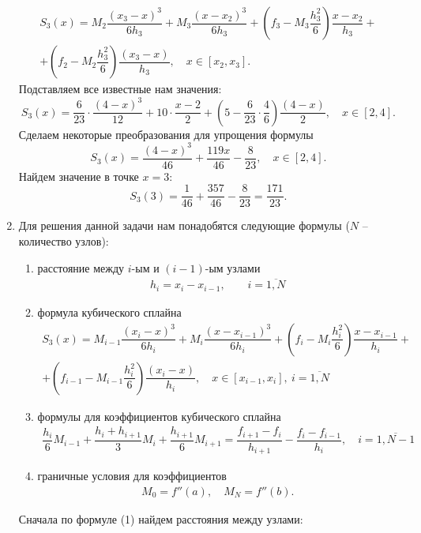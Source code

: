 \documentclass[a4paper, 12pt]{article}
\begin{document}
\begin{enumerate}
		\begin{multline*}
			S_3(x) = M_2\dfrac{(x_3 - x)^3}{6h_3} + M_{3}\dfrac{(x-x_2)^3}{6h_3} + \left(f_3 - M_3\dfrac{h_3^2}{6}\right)\dfrac{x-x_2}{h_3} +\\+ \left(f_2 - M_2\dfrac{h_3^2}{6}\right)\dfrac{(x_3 - x)}{h_3},\quad x\in [x_2, x_3].
		\end{multline*}
		Подставляем все известные нам значения:
		$$
		S_3(x) = \dfrac{6}{23}\cdot\dfrac{(4 - x)^3}{12} + 10\cdot\dfrac{x-2}{2} + \left(5 - \dfrac{6}{23}\cdot\dfrac{4}{6}\right)\dfrac{(4 - x)}{2},\quad x\in [2, 4].
		$$
		Сделаем некоторые преобразования для упрощения формулы
		$$
		S_3(x) = \dfrac{(4 - x)^3}{46} + \dfrac{119x}{46}-\dfrac{8}{23},\quad x\in [2, 4].
		$$
		Найдем значение в точке $x=3$:
		$$
		S_3(3) = \dfrac{1}{46} + \dfrac{357}{46} - \dfrac{8}{23} = \dfrac{171}{23}.
		$$
		\newpage
		\item 
		\hypertarget{t2}{}
		Для решения данной задачи нам понадобятся следующие формулы ($N$ -- количество узлов):\begin{enumerate}
			\item расстояние между $i$-ым и $(i-1)$-ым узлами \begin{eqnarray}
				h_i=x_i - x_{i-1},\qquad i=\overline{1,N}\label{1}
			\end{eqnarray}
			\item формула кубического сплайна\begin{multline}
				S_3(x) = M_{i-1}\dfrac{(x_i - x)^3}{6h_i} + M_{i}\dfrac{(x-x_{i-1})^3}{6h_i} + \left(f_i - M_i\dfrac{h_i^2}{6}\right)\dfrac{x-x_{i-1}}{h_i} +\\+ \left(f_{i-1} - M_{i-1}\dfrac{h_i^2}{6}\right)\dfrac{(x_i - x)}{h_i},\quad x\in [x_{i-1}, x_i],\ i = \overline{1,N}
			\end{multline}
			\item формулы для коэффициентов кубического сплайна
			\begin{multline}
				\dfrac{h_i}{6}M_{i-1} + \dfrac{h_i + h_{i+1}}{3}M_i + \dfrac{h_{i+1}}{6}M_{i+1} = \dfrac{f_{i+1} - f_i}{h_{i+1}} - \dfrac{f_i - f_{i-1}}{h_i},\quad i = \overline {1,N-1}
			\end{multline}
			\item граничные условия для коэффициентов \begin{eqnarray}
				M_0 = f''(a),\quad M_N = f''(b).
			\end{eqnarray}
		\end{enumerate}
		Сначала по формуле (1) найдем расстояния между узлами:
		$$\begin{matrix}

\end{matrix}$$
\end{enumerate}
\end{document}
